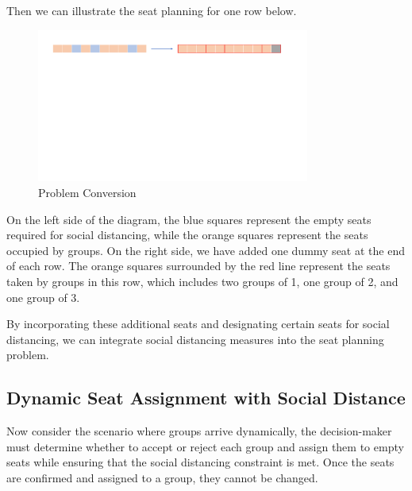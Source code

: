 Then we can illustrate the seat planning for one row below. 

\begin{figure}[ht]
    \centering
    \includegraphics[width = 0.8\textwidth]{./Figures/dummy_seat.pdf}
    \caption{Problem Conversion}
\end{figure}


On the left side of the diagram, the blue squares represent the empty seats required for social distancing, while the orange squares represent the seats occupied by groups. On the right side, we have added one dummy seat at the end of each row. The orange squares surrounded by the red line represent the seats taken by groups in this row, which includes two groups of 1, one group of 2, and one group of 3.

By incorporating these additional seats and designating certain seats for social distancing, we can integrate social distancing measures into the seat planning problem.



\subsection{Dynamic Seat Assignment with Social Distance}


Now consider the scenario where groups arrive dynamically, the decision-maker must determine whether to accept or reject each group and assign them to empty seats while ensuring that the social distancing constraint is met. Once the seats are confirmed and assigned to a group, they cannot be changed.


